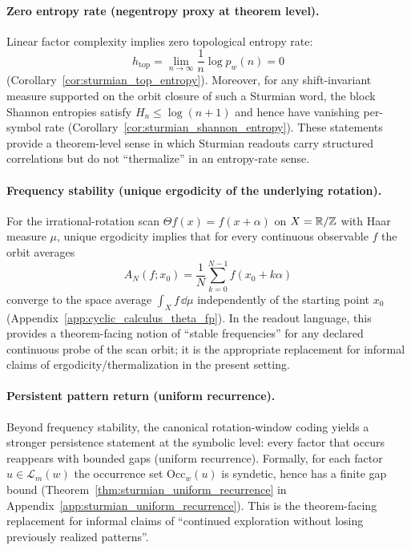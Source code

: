 \paragraph{Zero entropy rate (negentropy proxy at theorem level).}
\MathTag Linear factor complexity implies zero topological entropy rate:
\[
h_{\mathrm{top}}=\lim_{n\to\infty}\frac{1}{n}\log p_w(n)=0
\]
(Corollary~\ref{cor:sturmian_top_entropy}).
Moreover, for any shift-invariant measure supported on the orbit closure of such a Sturmian word, the block Shannon entropies satisfy $H_n\le \log(n+1)$ and hence have vanishing per-symbol rate (Corollary~\ref{cor:sturmian_shannon_entropy}).
These statements provide a theorem-level sense in which Sturmian readouts carry structured correlations but do not ``thermalize'' in an entropy-rate sense.

\paragraph{Frequency stability (unique ergodicity of the underlying rotation).}
\MathTag For the irrational-rotation scan $\Theta f(x)=f(x+\alpha)$ on $X=\mathbb{R}/\mathbb{Z}$ with Haar measure $\mu$, unique ergodicity implies that for every continuous observable $f$ the orbit averages
\[
A_N(f;x_0)=\frac{1}{N}\sum_{k=0}^{N-1}f(x_0+k\alpha)
\]
converge to the space average $\int_X f\,\dd\mu$ independently of the starting point $x_0$ (Appendix~\ref{app:cyclic_calculus_theta_fp}).
In the readout language, this provides a theorem-facing notion of ``stable frequencies'' for any declared continuous probe of the scan orbit; it is the appropriate replacement for informal claims of ergodicity/thermalization in the present setting.

\paragraph{Persistent pattern return (uniform recurrence).}
\MathTag Beyond frequency stability, the canonical rotation-window coding yields a stronger persistence statement at the symbolic level:
every factor that occurs reappears with bounded gaps (uniform recurrence).
Formally, for each factor $u\in\mathcal{L}_m(w)$ the occurrence set $\mathrm{Occ}_w(u)$ is syndetic, hence has a finite gap bound (Theorem~\ref{thm:sturmian_uniform_recurrence} in Appendix~\ref{app:sturmian_uniform_recurrence}).
This is the theorem-facing replacement for informal claims of ``continued exploration without losing previously realized patterns''.

